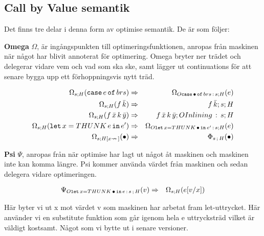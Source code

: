 \documentclass[../Optimise]{subfiles}
\begin{document}
\subsection{Call by Value semantik}


Det finns tre delar i denna form av optimise semantik. De är som följer:

\textbf{Omega} $\Omega$, är ingångspunkten till optimeringsfunktionen, anropas från maskinen
när något har blivit annoterat för optimering. Omega bryter ner trädet
och delegerar vidare vem och vad som ska ske, samt lägger ut continuations
för att senare bygga upp ett förhoppningsvis nytt träd.

\begin{align*}
\Omega_{s;H}(\mathtt{case}\,e\,\mathtt{of}\,brs) & \Rightarrow & \Omega_{O\mathtt{case}\,\bullet\,\mathtt{of}\,brs\,:\,s;H}(e)\\
\Omega_{s;H}(f\,\bar{k}) & \Rightarrow & f\,\bar{k};s;H\\
\Omega_{s;H}(f\,\bar{x}\, k\,\bar{y}) & \Rightarrow & f\,\bar{x}\, k\,\bar{y};OInlining\,:\,s;H\\
\Omega_{s;H}(\mathtt{let}\,x=THUNK\,e\,\mathtt{in}\,e') & \Rightarrow & \Omega_{O\mathtt{let\,}x=THUNK\,\bullet\,\mathtt{in}\,e'\,:\,s;H}(e)\\
\Omega_{s;H[x\nrightarrow\,]}(\bullet) & \Rightarrow & \Phi_{s\,;\,H}(\bullet)
\end{align*}


\textbf{Psi} $\Psi$, anropas från när optimise har lagt ut något åt maskinen och
maskinen inte kan komma längre. Psi kommer använda värdet från maskinen
och sedan delegera vidare optimeringen.

\begin{align*}
\Psi_{O\mathtt{let\,}x=THUNK\,\bullet\,\mathtt{in}\,e\,:\,s\,;\,H}(v) & \Rightarrow & \Omega_{s;H}(e[v/x])
\end{align*}


Här byter vi ut x mot värdet v som maskinen har arbetat fram let-uttrycket.
Här använder vi en substitute funktion som går igenom hela e uttrycksträd
vilket är väldigt kostsamt. Något som vi bytte ut i senare versioner.
\end{document}
